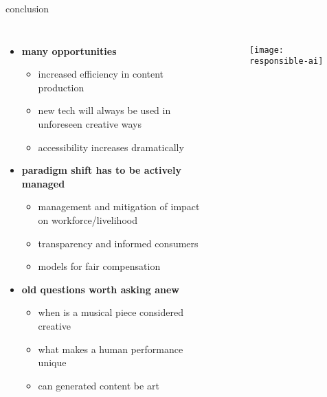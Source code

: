 \begin{frame}{conclusion}{}
    \vspace{-7mm}
    \begin{columns}
        \begin{itemize}
             \item   \textbf{many opportunities}
                \begin{itemize}
                    \item increased efficiency in content production
                    \item new tech will always be used in unforeseen creative ways
                    \item accessibility increases dramatically
                \end{itemize}
            \smallskip
           \item   \textbf{paradigm shift has to be actively managed}
                \begin{itemize}
                    \item management and mitigation of impact on workforce/livelihood
                    \item transparency and informed consumers
                    \item models for fair compensation
                \end{itemize}
            \smallskip
            \item   \textbf{old questions worth asking anew}
                \begin{itemize}
                    \item when is a musical piece considered creative
                    \item what makes a human performance unique
                    \item can generated content be art
                \end{itemize}
        \end{itemize}
        \vspace{20mm}
        \begin{figure}%
            \texttt{[image: responsible-ai]}%
        \end{figure}
    \end{columns}
\end{frame}